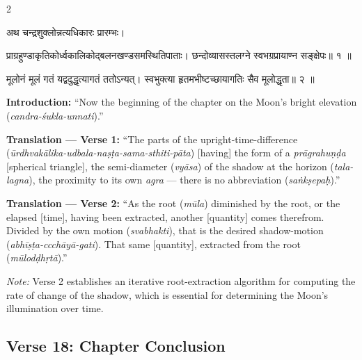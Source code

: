 \documentclass[11pt,a4paper]{article}
\newcommand{\dev}[1]{{\devanagarifont #1}}
\newenvironment{sanskritverse}{%
  \begin{center}\begin{minipage}{0.95\textwidth}
  \setlength{\leftskip}{1em}
  \setlength{\rightskip}{1em}
  \dev
}{\end{minipage}\end{center}}
\begin{document}
\begin{paracol}{2}

\begin{sanskritverse}
अथ चन्द्रशुक्लोन्नत्यधिकारः प्रारम्भः।
\end{sanskritverse}

\begin{sanskritverse}
प्राग्रहुण्डाकृतिकोर्ध्वकालिकोद्बलनखण्डसमस्थितिपाताः।
छन्दोव्यासस्तलग्ने स्वभग्रप्रायाण्न सङ्क्षेपः॥ १ ॥
\end{sanskritverse}

\begin{sanskritverse}
मूलोनं मूलं गतं यद्वदुद्धृत्यागतं ततोऽन्यत्।
स्वभुक्त्या हृतमभीष्टच्छायागतिः सैव मूलोद्धृता॥ २ ॥
\end{sanskritverse}

\switchcolumn

\textbf{Introduction:} ``Now the beginning of the chapter on the Moon's bright elevation (\textit{candra-śukla-unnati}).''

\textbf{Translation — Verse 1:} ``The parts of the upright-time-difference (\textit{ūrdhvakālika-udbala-naṣṭa-sama-sthiti-pāta}) [having] the form of a \textit{prāgrahuṇḍa} [spherical triangle], the semi-diameter (\textit{vyāsa}) of the shadow at the horizon (\textit{tala-lagna}), the proximity to its own \textit{agra} --- there is no abbreviation (\textit{saṅkṣepaḥ}).''

\textbf{Translation — Verse 2:} ``As the root (\textit{mūla}) diminished by the root, or the elapsed [time], having been extracted, another [quantity] comes therefrom. Divided by the own motion (\textit{svabhakti}), that is the desired shadow-motion (\textit{abhīṣṭa-ccchāyā-gati}). That same [quantity], extracted from the root (\textit{mūlodḍhṛtā}).''

\textit{Note:} Verse 2 establishes an iterative root-extraction algorithm for computing the rate of change of the shadow, which is essential for determining the Moon's illumination over time.

\end{paracol}

\subsection{Verse 18: Chapter Conclusion}
\end{document}
